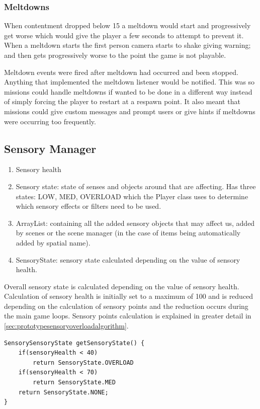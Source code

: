 \documentclass[11pt]{report}
\begin{document}
\subsubsection{Meltdowns}
When contentment dropped below 15 a meltdown would start and progressively get worse which would give the player a few seconds to attempt to prevent it. When a meltdown starts the first person camera starts to shake giving warning; and then gets progressively worse to the point the game is not playable. 

Meltdown events were fired after meltdown had occurred and been stopped. Anything that implemented the meltdown listener would be notified. This was so missions could handle meltdowns if wanted to be done in a different way instead of simply forcing the player to restart at a respawn point. It also meant that missions could give custom messages and prompt users or give hints if meltdowns were occurring too frequently.


\subsection{Sensory Manager}

\begin{enumerate}
\item Sensory health
\item Sensory state: state of senses and objects around that are affecting. Has three states: LOW, MED, OVERLOAD which the Player class uses to determine which sensory effects or filters need to be used.
\item ArrayList: containing all the added sensory objects that may affect us, added by scenes or the scene manager (in the case of items being automatically added by spatial name). 
\item SensoryState: sensory state calculated depending on the value of sensory health. 
\end{enumerate}

Overall sensory state is calculated depending on the value of sensory health. Calculation of sensory health is initially set to a maximum of 100 and is reduced depending on the calculation of sensory points and the reduction occurs during the main game loops. Sensory points calculation is explained in greater detail in \ref{sec:prototypesensoryoverloadalgorithm}.

\begin{lstlisting}
SensorySensoryState getSensoryState() {
	if(sensoryHealth < 40)
		return SensoryState.OVERLOAD
	if(sensoryHealth < 70)
		return SensoryState.MED
	return SensoryState.NONE;
}
\end{lstlisting}
\end{document}
